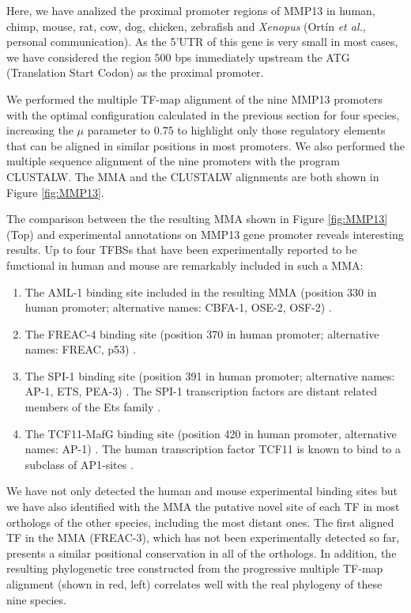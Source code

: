 Here, we have analized the proximal promoter regions of MMP13 in human, chimp, mouse, rat, 
cow, dog, chicken, zebrafish and \emph{Xenopus} (Ort\'in \emph{et al.}, 
personal communication). As the 5'UTR of this gene is very small in most cases, we have 
considered the region $500$ bps immediately upstream the ATG (Translation Start Codon) as 
the proximal promoter.

We performed the multiple TF-map alignment of the nine MMP13 promoters with 
the optimal configuration calculated in the previous section for four species, 
increasing the $\mu$ parameter to $0.75$ to highlight only those regulatory elements 
that can be aligned in similar positions in most promoters. We also performed the 
multiple sequence alignment of the nine promoters with the program CLUSTALW. The MMA and 
the CLUSTALW alignments are both shown in Figure \ref{fig:MMP13}. 

The comparison between the the resulting MMA shown in Figure \ref{fig:MMP13} (Top) and experimental
annotations on MMP13 gene promoter reveals interesting results. Up to four TFBSs 
that have been experimentally reported to be functional in human and mouse
are remarkably included in such a MMA:

\begin{enumerate}
\item
The AML-1 binding site included in the resulting MMA (position 330 in human promoter; 
alternative names: CBFA-1, OSE-2, OSF-2) \citep{pendas:1997a,jimenez:1999a,hess:2001a}.

\item
The FREAC-4 binding site (position 370 in human promoter; alternative names: FREAC, p53) \citep{sun:2000a}. 
\item
The SPI-1 binding site (position 391 in human promoter; alternative names: AP-1, ETS, PEA-3) 
\citep{pendas:1997a,benbow:1997a,wu:2002a}. The SPI-1 transcription factors are distant related 
members of the Ets family \citep{ray:1995a}.

\item
The TCF11-MafG binding site (position 420 in human promoter, alternative names: AP-1)
\citep{pendas:1997a,benbow:1997a,wu:2002a}. The human transcription factor TCF11 
is known to bind to a subclass of AP1-sites \citep{johnsen:1998a}.
\end{enumerate}

We have not only detected the human and mouse experimental binding sites but we have 
also identified with the MMA the putative novel site of each TF in most orthologs 
of the other species, including the most distant ones. The first 
aligned TF in the MMA (FREAC-3), which has not been experimentally detected so 
far, presents a similar positional conservation in all of the orthologs. 
In addition, the resulting phylogenetic tree constructed from the progressive multiple 
TF-map alignment (shown in red, left) correlates well with the real phylogeny of these 
nine species.

